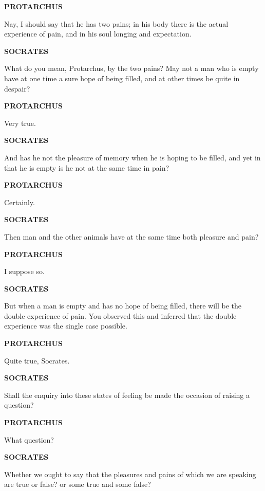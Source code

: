 \documentclass[11pt,letter]{article}
\begin{document}
\par \textbf{PROTARCHUS}
\par   Nay, I should say that he has two pains; in his body there is the actual experience of pain, and in his soul longing and expectation.

\par \textbf{SOCRATES}
\par   What do you mean, Protarchus, by the two pains? May not a man who is empty have at one time a sure hope of being filled, and at other times be quite in despair?

\par \textbf{PROTARCHUS}
\par   Very true.

\par \textbf{SOCRATES}
\par   And has he not the pleasure of memory when he is hoping to be filled, and yet in that he is empty is he not at the same time in pain?

\par \textbf{PROTARCHUS}
\par   Certainly.

\par \textbf{SOCRATES}
\par   Then man and the other animals have at the same time both pleasure and pain?

\par \textbf{PROTARCHUS}
\par   I suppose so.

\par \textbf{SOCRATES}
\par   But when a man is empty and has no hope of being filled, there will be the double experience of pain. You observed this and inferred that the double experience was the single case possible.

\par \textbf{PROTARCHUS}
\par   Quite true, Socrates.

\par \textbf{SOCRATES}
\par   Shall the enquiry into these states of feeling be made the occasion of raising a question?

\par \textbf{PROTARCHUS}
\par   What question?

\par \textbf{SOCRATES}
\par   Whether we ought to say that the pleasures and pains of which we are speaking are true or false? or some true and some false?
\end{document}
